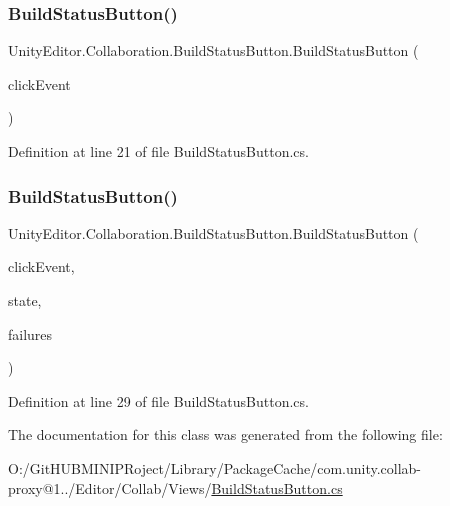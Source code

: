 \subsubsection{\texorpdfstring{BuildStatusButton()}{BuildStatusButton()}\hspace{0.1cm}{\footnotesize\ttfamily [1/2]}}
{\footnotesize\ttfamily Unity\+Editor.\+Collaboration.\+Build\+Status\+Button.\+Build\+Status\+Button (\begin{DoxyParamCaption}\item[{Action}]{click\+Event }\end{DoxyParamCaption})}



Definition at line 21 of file Build\+Status\+Button.\+cs.

\mbox{\label{class_unity_editor_1_1_collaboration_1_1_build_status_button_ac7815a85706c872cbdf3eb3d025b89c0}} 
\subsubsection{\texorpdfstring{BuildStatusButton()}{BuildStatusButton()}\hspace{0.1cm}{\footnotesize\ttfamily [2/2]}}
{\footnotesize\ttfamily Unity\+Editor.\+Collaboration.\+Build\+Status\+Button.\+Build\+Status\+Button (\begin{DoxyParamCaption}\item[{Action}]{click\+Event,  }\item[{Build\+State}]{state,  }\item[{int}]{failures }\end{DoxyParamCaption})}



Definition at line 29 of file Build\+Status\+Button.\+cs.



The documentation for this class was generated from the following file\+:\begin{DoxyCompactItemize}
\item 
O\+:/\+Git\+H\+U\+B\+M\+I\+N\+I\+P\+Roject/\+Library/\+Package\+Cache/com.\+unity.\+collab-\/proxy@1../\+Editor/\+Collab/\+Views/\mbox{\hyperlink{_build_status_button_8cs}{Build\+Status\+Button.\+cs}}\end{DoxyCompactItemize}
